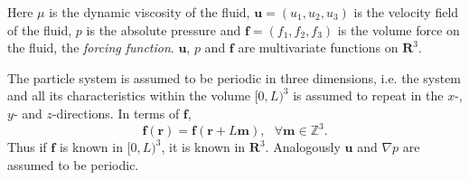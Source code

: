 \documentclass[a4paper,
twoside=false,abstract=false,numbers=noenddot,
titlepage=false,headings=small,parskip=half,version=last]{scrartcl}
\begin{document}
Here $\mu$ is the dynamic viscosity of the fluid, $\mathbf{u}=(u_1,u_2,u_3)$ is the velocity field of the fluid, $p$ is the absolute pressure and $\mathbf{f}=(f_1,f_2,f_3)$ is the volume force on the fluid, the \emph{forcing function}. $\mathbf{u}$, $p$ and $\mathbf{f}$ are multivariate functions on $\mathbf{R}^3$.

The particle system is assumed to be periodic in three dimensions, i.e. the system and all its characteristics within the volume $[0,L)^3$ is assumed to repeat in the $x$-,$y$- and $z$-directions.
In terms of $\mathbf{f}$,
\begin{equation}
\mathbf{f}(\mathbf{r}) = \mathbf{f}(\mathbf{r}+L\mathbf{m}),\text{ }\forall \mathbf{m} \in \mathbb{Z}^3.
\end{equation}
Thus if $\mathbf{f}$ is known in $[0,L)^3$, it is known in $\mathbf{R}^3$. Analogously $\mathbf{u}$ and $\nabla p$ are assumed to be periodic.
\end{document}
